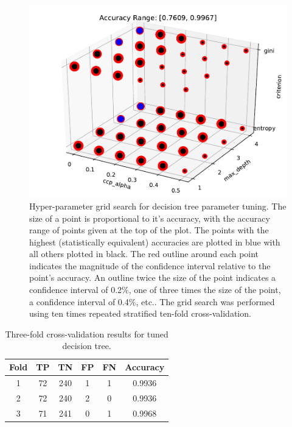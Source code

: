 \documentclass[paper=a4, fontsize=11pt]{scrartcl} %
\begin{document}
\begin{figure}[H]
	\centering
	\includegraphics[scale=0.6]{../output/DT/DT_941_486/DT_gridsearch_941_486_global_standard.pdf}
	\caption{Hyper-parameter grid search for decision tree parameter tuning.
		The size of a point is proportional to it's accuracy, with the accuracy range of points given at the top of the plot.
		The points with the highest (statistically equivalent) accuracies are plotted in blue with all others plotted in black.
		The red outline around each point indicates the magnitude of the confidence interval relative to the point's accuracy.
		An outline twice the size of the point indicates a confidence interval of 0.2\%, one of three times the size of the point, a confidence interval of 0.4\%, etc..
		The grid search was performed using ten times repeated stratified ten-fold cross-validation.}
	\label{fig: tree grid}
\end{figure}

\begin{table}[H]
	\centering
	\caption{Three-fold cross-validation results for tuned decision tree.}
	\begin{tabular}{|c|c|c|c|c|c|}
		\hline
		\textbf{Fold} & \textbf{TP} & \textbf{TN} & \textbf{FP} & \textbf{FN} & \textbf{Accuracy} \\ \hline \hline
		1 & 72 & 240 & 1 & 1 & 0.9936  \\ \hline
		2 & 72 & 240 & 2 & 0 & 0.9936  \\ \hline
		3 & 71 & 241 & 0 & 1 & 0.9968  \\ \hline
	\end{tabular}
	\label{tab: cv best tree}
\end{table}
\end{document}

